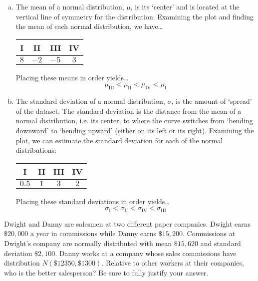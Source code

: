 \documentclass[12pt,letterpaper]{exam}
\begin{document}
\begin{questions}
\sol 
\begin{enumerate}[(a)]
\item The mean of a normal distribution, $\mu$, is its `center' and is located at the vertical line of symmetry for the distribution. Examining the plot and finding the mean of each normal distribution, we have\dots \par
	\begin{table}[ht]
	\centering
	\begin{tabular}{cccc}
	I & II & III & IV \\ \hline
	$8$ & $-2$ & $-5$ & $3$
	\end{tabular}
	\end{table} \par
Placing these means in order yields\dots
	\[
	\mu_{\text{III}} < \mu_{\text{II}} < \mu_{\text{IV}} < \mu_{\text{I}}
	\] \pspace

\item The standard deviation of a normal distribution, $\sigma$, is the amount of `spread' of the dataset. The standard deviation is the distance from the mean of a normal distribution, i.e. its center, to where the curve switches from `bending downward' to `bending upward' (either on its left or its right). Examining the plot, we can estimate the standard deviation for each of the normal distributions:
	\begin{table}[ht]
	\centering
	\begin{tabular}{cccc}
	I & II & III & IV \\ \hline
	$0.5$ & $1$ & $3$ & $2$
	\end{tabular}
	\end{table} \par
Placing these standard deviations in order yields\dots
	\[
	\sigma_{\text{I}} < \sigma_{\text{II}} < \sigma_{\text{IV}} < \sigma_{\text{III}}
	\]
\end{enumerate}



\newpage
\question[10] Dwight and Danny are salesmen at two different paper companies. Dwight earns $\$20\!,000$ a year in commissions while Danny earns $\$15\!,200$. Commissions at Dwight's company are normally distributed with mean $\$15,\!620$ and standard deviation $\$2,\!100$. Danny works at a company whose sales commissions have distribution $N(\$12350, \$1300)$. Relative to other workers at their companies, who is the better salesperson? Be sure to fully justify your answer. \pspace


\end{questions}
\end{document}

